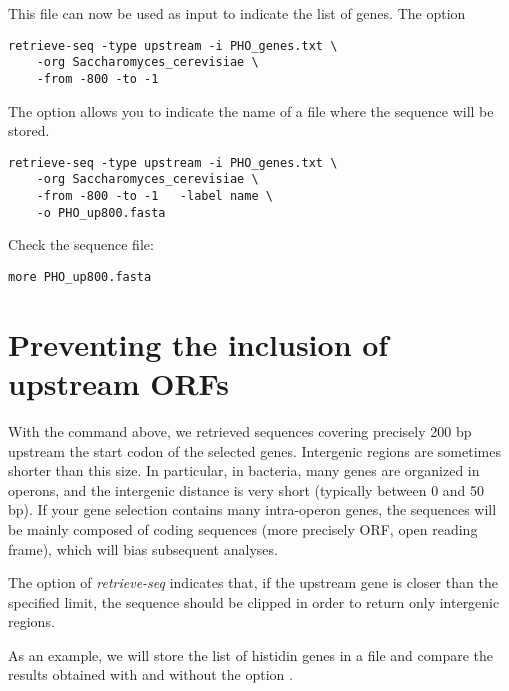 This file can now be used as input to indicate the list of genes. The option  

{\color{Blue} \begin{footnotesize}
\begin{verbatim}
retrieve-seq -type upstream -i PHO_genes.txt \
    -org Saccharomyces_cerevisiae \
    -from -800 -to -1  
\end{verbatim} \end{footnotesize}
} 

The option  allows you to indicate the name of a file where
the sequence will be stored.

{\color{Blue} \begin{footnotesize}
\begin{verbatim}
retrieve-seq -type upstream -i PHO_genes.txt \
    -org Saccharomyces_cerevisiae \
    -from -800 -to -1   -label name \
    -o PHO_up800.fasta
\end{verbatim} \end{footnotesize}
} 

Check the sequence file:

{\color{Blue} \begin{footnotesize}
\begin{verbatim}
more PHO_up800.fasta
\end{verbatim} \end{footnotesize}
}


\section{Preventing the inclusion of upstream ORFs}

With the command above, we retrieved sequences covering precisely 200
bp upstream the start codon of the selected genes. Intergenic regions
are sometimes shorter than this size. In particular, in bacteria, many
genes are organized in operons, and the intergenic distance is very
short (typically between 0 and 50 bp). If your gene selection contains
many intra-operon genes, the sequences will be mainly composed of
coding sequences (more precisely ORF, open reading frame), which will
bias subsequent analyses.

The option  of \textit{retrieve-seq} indicates that, if
the upstream gene is closer than the specified limit, the sequence
should be clipped in order to return only intergenic regions.

As an example, we will store the list of histidin genes in a file and
compare the results obtained with and without the option
\option{-noorf}.

